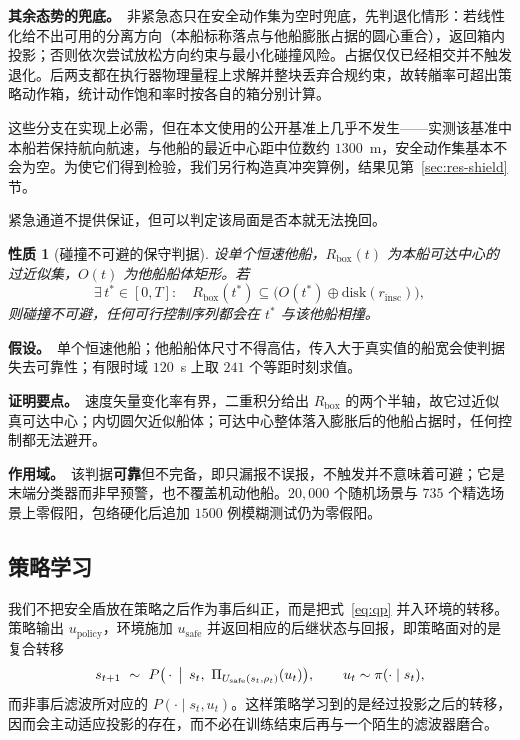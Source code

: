\documentclass[12pt,letterpaper]{article}
\newtheorem{prop}{性质}
\begin{document}
\textbf{其余态势的兜底。}\ 非紧急态只在安全动作集为空时兜底，先判退化情形：若线性化给不出可用的分离方向（本船标称落点与他船膨胀占据的圆心重合），返回箱内投影；否则依次尝试放松方向约束与最小化碰撞风险。占据仅仅已经相交并不触发退化。后两支都在执行器物理量程上求解并整块丢弃合规约束，故转艏率可超出策略动作箱，统计动作饱和率时按各自的箱分别计算。

这些分支在实现上必需，但在本文使用的公开基准上几乎不发生——实测该基准中本船若保持航向航速，与他船的最近中心距中位数约 $1300$~m，安全动作集基本不会为空。为使它们得到检验，我们另行构造真冲突算例，结果见第~\ref{sec:res-shield} 节。


紧急通道不提供保证，但可以判定该局面是否本就无法挽回。
\begin{prop}[碰撞不可避的保守判据]\label{prop:imminent}
设单个恒速他船，$R_{\mathrm{box}}(t)$ 为本船可达中心的过近似集，$O(t)$ 为他船船体矩形。若
\begin{equation}
 \exists\,t^\ast\in[0,T]:\quad R_{\mathrm{box}}(t^\ast)\subseteq\bigl(O(t^\ast)\oplus\mathrm{disk}(r_{\mathrm{insc}})\bigr),
 \label{eq:imminent}
\end{equation}
则碰撞不可避，任何可行控制序列都会在 $t^\ast$ 与该他船相撞。
\end{prop}

\noindent\textbf{假设。}\ 单个恒速他船；他船船体尺寸不得高估，传入大于真实值的船宽会使判据失去可靠性；有限时域 $120$~s 上取 $241$ 个等距时刻求值。

\noindent\textbf{证明要点。}\ 速度矢量变化率有界，二重积分给出 $R_{\mathrm{box}}$ 的两个半轴，故它过近似真可达中心；内切圆欠近似船体；可达中心整体落入膨胀后的他船占据时，任何控制都无法避开。

\noindent\textbf{作用域。}\ 该判据\textbf{可靠}但不完备，即只漏报不误报，不触发并不意味着可避；它是末端分类器而非早预警，也不覆盖机动他船。$20{,}000$ 个随机场景与 $735$ 个精选场景上零假阳，包络硬化后追加 $1500$ 例模糊测试仍为零假阳。

\subsection{策略学习}
\label{sec:rl}


我们不把安全盾放在策略之后作为事后纠正，而是把式~\eqref{eq:qp} 并入环境的转移。策略输出 $u_{\mathrm{policy}}$，环境施加 $u_{\mathrm{safe}}$ 并返回相应的后继状态与回报，即策略面对的是复合转移
\begin{equation}
 s_{t+1}\ \sim\ P\bigl(\,\cdot\,\bigm|\, s_t,\ \Pi_{U_{\mathrm{safe}}(s_t,\rho_t)}(u_t)\bigr),
 \qquad u_t\sim\pi(\cdot\mid s_t),
 \label{eq:shielded-mdp}
\end{equation}
而非事后滤波所对应的 $P(\cdot\mid s_t,u_t)$。这样策略学习到的是经过投影之后的转移，因而会主动适应投影的存在，而不必在训练结束后再与一个陌生的滤波器磨合。
\end{document}
